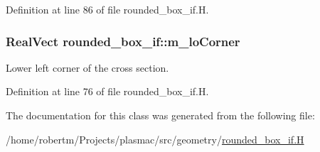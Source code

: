Definition at line 86 of file rounded\+\_\+box\+\_\+if.\+H.

\subsubsection[{\texorpdfstring{m\+\_\+lo\+Corner}{m_loCorner}}]{\setlength{\rightskip}{0pt plus 5cm}Real\+Vect rounded\+\_\+box\+\_\+if\+::m\+\_\+lo\+Corner\hspace{0.3cm}{\ttfamily [protected]}}\hypertarget{classrounded__box__if_a003b9c5a95dec4837a7f080385b2a70c}{}\label{classrounded__box__if_a003b9c5a95dec4837a7f080385b2a70c}


Lower left corner of the cross section. 



Definition at line 76 of file rounded\+\_\+box\+\_\+if.\+H.



The documentation for this class was generated from the following file\+:\begin{DoxyCompactItemize}
\item 
/home/robertm/\+Projects/plasmac/src/geometry/\hyperlink{rounded__box__if_8H}{rounded\+\_\+box\+\_\+if.\+H}\end{DoxyCompactItemize}
